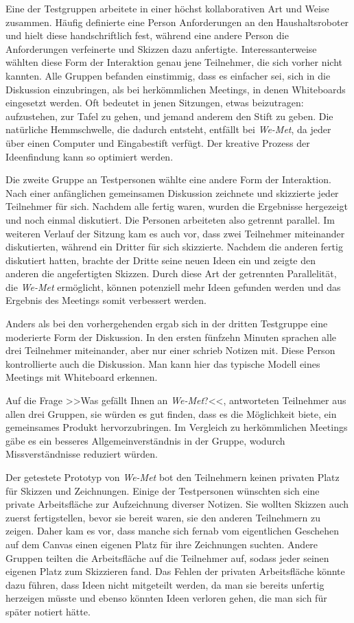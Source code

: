 \medskip Eine der Testgruppen arbeitete in einer höchst kollaborativen Art und Weise zusammen. Häufig definierte eine Person Anforderungen an den Haushaltsroboter und hielt diese handschriftlich fest, während eine andere Person die Anforderungen verfeinerte und Skizzen dazu anfertigte. Interessanterweise wählten diese Form der Interaktion genau jene Teilnehmer, die sich vorher nicht kannten. Alle Gruppen befanden einstimmig, dass es einfacher sei, sich in die Diskussion einzubringen, als bei herkömmlichen Meetings, in denen Whiteboards eingesetzt werden. Oft bedeutet in jenen Sitzungen, etwas beizutragen: aufzustehen, zur Tafel zu gehen, und jemand anderem den Stift zu geben. Die natürliche Hemmschwelle, die dadurch entsteht, entfällt bei \emph{We-Met}, da jeder über einen Computer und Eingabestift verfügt. Der kreative Prozess der Ideenfindung kann so optimiert werden.
	
\medskip Die zweite Gruppe an Testpersonen wählte eine andere Form der Interaktion. Nach einer anfänglichen gemeinsamen Diskussion zeichnete und skizzierte jeder Teilnehmer für sich. Nachdem alle fertig waren, wurden die Ergebnisse hergezeigt und noch einmal diskutiert. Die Personen arbeiteten also getrennt parallel. Im weiteren Verlauf der Sitzung kam es auch vor, dass zwei Teilnehmer miteinander diskutierten, während ein Dritter für sich skizzierte. Nachdem die anderen fertig diskutiert hatten, brachte der Dritte seine neuen Ideen ein und zeigte den anderen die angefertigten Skizzen. Durch diese Art der getrennten Parallelität, die \emph{We-Met} ermöglicht, können potenziell mehr Ideen gefunden werden und das Ergebnis des Meetings somit verbessert werden.
	
\medskip Anders als bei den vorhergehenden ergab sich in der dritten Testgruppe eine moderierte Form der Diskussion. In den ersten fünfzehn Minuten sprachen alle drei Teilnehmer miteinander, aber nur einer schrieb Notizen mit. Diese Person kontrollierte auch die Diskussion. Man kann hier das typische Modell eines Meetings mit Whiteboard erkennen.
	
\medskip Auf die Frage >>Was gefällt Ihnen an \emph{We-Met}?<<, antworteten Teilnehmer aus allen drei Gruppen, sie würden es gut finden, dass es die Möglichkeit biete, ein gemeinsames Produkt hervorzubringen. Im Vergleich zu herkömmlichen Meetings gäbe es ein besseres Allgemeinverständnis in der Gruppe, wodurch Missverständnisse reduziert würden.
	
\medskip Der getestete Prototyp von \emph{We-Met} bot den Teilnehmern keinen privaten Platz für Skizzen und Zeichnungen. Einige der Testpersonen wünschten sich eine private Arbeitsfläche zur Aufzeichnung diverser Notizen. Sie wollten Skizzen auch zuerst fertigstellen, bevor sie bereit waren, sie den anderen Teilnehmern zu zeigen. Daher kam es vor, dass manche sich fernab vom eigentlichen Geschehen auf dem Canvas einen eigenen Platz für ihre Zeichnungen suchten. Andere Gruppen teilten die Arbeitsfläche auf die Teilnehmer auf, sodass jeder seinen eigenen Platz zum Skizzieren fand. Das Fehlen der privaten Arbeitsfläche könnte dazu führen, dass Ideen nicht mitgeteilt werden, da man sie bereits unfertig herzeigen müsste und ebenso könnten Ideen verloren gehen, die man sich für später notiert hätte.
	

